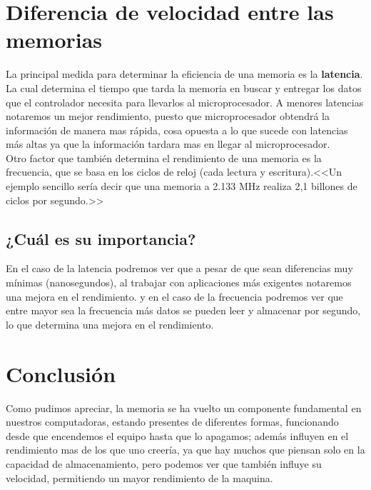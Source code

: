 \documentclass{article}
\begin{document}
\section{Diferencia de velocidad entre las memorias} \label{contenido} 
La principal medida para determinar la eficiencia de una memoria es la \textbf{latencia}. La cual determina el tiempo que tarda la memoria en buscar y entregar los datos que el controlador necesita para llevarlos al microprocesador.\cite{referencia}
A menores latencias notaremos un mejor rendimiento, puesto que microprocesador obtendrá la información de manera mas rápida, cosa opuesta a lo que sucede con latencias más altas ya que la información tardara mas en llegar al microprocesador. \\
Otro factor que también determina el rendimiento de una memoria es la frecuencia, que se basa en los ciclos de reloj (cada lectura y escritura).<<Un ejemplo sencillo sería decir que una memoria a 2.133 MHz realiza 2,1 billones de ciclos por segundo.>>\cite{frecuencia}

\subsection{¿Cuál es su importancia?}
En el caso de la latencia podremos ver que a pesar de que  sean diferencias muy mínimas (nanosegundos), al trabajar con aplicaciones más exigentes notaremos una mejora en el rendimiento.\cite{latencia}
y en el caso de la frecuencia podremos ver que entre mayor sea la frecuencia más datos se pueden leer y almacenar por segundo, lo que determina una mejora en el rendimiento.

\section{Conclusión} \label{conclulsion}
Como pudimos apreciar, la memoria se ha vuelto un componente fundamental en nuestros computadoras, estando presentes de diferentes formas, funcionando desde que encendemos el equipo hasta que lo apagamos; además influyen en el rendimiento mas de los que uno creería, ya que hay muchos que piensan solo en la capacidad de almacenamiento, pero podemos ver que también influye su velocidad, permitiendo un mayor rendimiento de la maquina.



\end{document}
